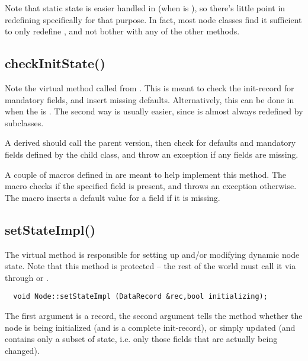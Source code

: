   Note that static state is easier handled in  (when
   is ), so there's little point in redefining
   specifically for that purpose. In fact, most node classes find it
  sufficient to only redefine , and not bother with any of
  the other methods. 

\subsection{checkInitState()}
  
  Note the virtual  method called from .
  This is meant to check the init-record for mandatory fields, and insert
  missing defaults. Alternatively, this can be done in  when
  the  is . The second way is usually easier, since
   is almost always redefined by subclasses.

  A derived  should call the parent version, then check
  for defaults and mandatory fields defined by the child class, and throw an
  exception if any fields are missing.

  A couple of macros defined in  are meant to help implement this
  method. The  macro checks if the specified
  field is present, and throws an exception otherwise. The
   macro inserts a default value for a
  field if it is missing.  
  
\subsection{setStateImpl()}

  The virtual  method is responsible for setting up and/or
  modifying dynamic node state. Note that this method is protected -- the rest
  of the world must call it via through  or .

  \begin{verbatim}
  void Node::setStateImpl (DataRecord &rec,bool initializing);
  \end{verbatim}
  
  The first argument is a record, the second argument tells the method whether
  the node is being initialized (and  is a complete init-record), or
  simply updated (and  contains only a subset of state, i.e. only those
  fields that are actually being changed).
  

